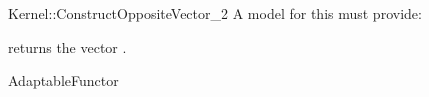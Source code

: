 \begin{ccRefFunctionObjectConcept}{Kernel::ConstructOppositeVector_2}
A model for this must provide:


{returns the vector .}

\ccRefines
AdaptableFunctor

\ccSeeAlso
{} \\

\end{ccRefFunctionObjectConcept}
